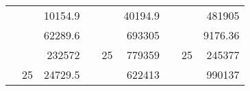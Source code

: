 \begin{table}[]
\begin{tabular}{|ccrccrccc}
\rowcolor[HTML]{DAE8FC} 
\multicolumn{1}{|c|}{\cellcolor[HTML]{FFFFC7}}                                & \multicolumn{1}{c|}{\cellcolor[HTML]{DAE8FC}}                      & \multicolumn{1}{r|}{\cellcolor[HTML]{DAE8FC}10154.9}   & \multicolumn{1}{c|}{\cellcolor[HTML]{FFFFC7}}                                & \multicolumn{1}{c|}{\cellcolor[HTML]{DAE8FC}}                       & \multicolumn{1}{r|}{\cellcolor[HTML]{DAE8FC}40194.9}   & \multicolumn{1}{c|}{\cellcolor[HTML]{FFFFC7}}                                & \multicolumn{1}{c|}{\cellcolor[HTML]{DAE8FC}}                      & \multicolumn{1}{r|}{\cellcolor[HTML]{DAE8FC}481905}    \\ \cline{3-3} \cline{6-6} \cline{9-9} 
\multicolumn{1}{|c|}{\cellcolor[HTML]{FFFFC7}}                                & \multicolumn{1}{c|}{\cellcolor[HTML]{DAE8FC}}                      & \multicolumn{1}{r|}{\cellcolor[HTML]{DDFDFF}62289.6}   & \multicolumn{1}{c|}{\cellcolor[HTML]{FFFFC7}}                                & \multicolumn{1}{c|}{\cellcolor[HTML]{DAE8FC}}                       & \multicolumn{1}{r|}{\cellcolor[HTML]{DDFDFF}693305}    & \multicolumn{1}{c|}{\cellcolor[HTML]{FFFFC7}}                                & \multicolumn{1}{c|}{\cellcolor[HTML]{DAE8FC}}                      & \multicolumn{1}{r|}{\cellcolor[HTML]{DDFDFF}9176.36}   \\ \cline{3-3} \cline{6-6} \cline{9-9} 
\rowcolor[HTML]{DAE8FC} 
\multicolumn{1}{|c|}{\cellcolor[HTML]{FFFFC7}}                                & \multicolumn{1}{c|}{\cellcolor[HTML]{DAE8FC}}                      & \multicolumn{1}{r|}{\cellcolor[HTML]{DAE8FC}232572}    & \multicolumn{1}{c|}{\cellcolor[HTML]{FFFFC7}}                                & \multicolumn{1}{c|}{\multirow{-9}{*}{\cellcolor[HTML]{DAE8FC}25}}   & \multicolumn{1}{r|}{\cellcolor[HTML]{DAE8FC}779359}    & \multicolumn{1}{c|}{\cellcolor[HTML]{FFFFC7}}                                & \multicolumn{1}{c|}{\multirow{-9}{*}{\cellcolor[HTML]{DAE8FC}25}}  & \multicolumn{1}{r|}{\cellcolor[HTML]{DAE8FC}245377}    \\ \cline{3-3} \cline{5-6} \cline{8-9} 
\multicolumn{1}{|c|}{\cellcolor[HTML]{FFFFC7}}                                & \multicolumn{1}{c|}{\multirow{-10}{*}{\cellcolor[HTML]{DAE8FC}25}} & \multicolumn{1}{r|}{\cellcolor[HTML]{DDFDFF}24729.5}   & \multicolumn{1}{c|}{\cellcolor[HTML]{FFFFC7}}                                & \multicolumn{1}{c|}{\cellcolor[HTML]{DDFDFF}}                       & \multicolumn{1}{r|}{\cellcolor[HTML]{DAE8FC}622413}    & \multicolumn{1}{c|}{\cellcolor[HTML]{FFFFC7}}                                & \multicolumn{1}{c|}{\cellcolor[HTML]{DDFDFF}}                      & \multicolumn{1}{r|}{\cellcolor[HTML]{DAE8FC}990137}    \\ \cline{2-3} \cline{6-6} \cline{9-9} 

\end{tabular}
\end{table}
